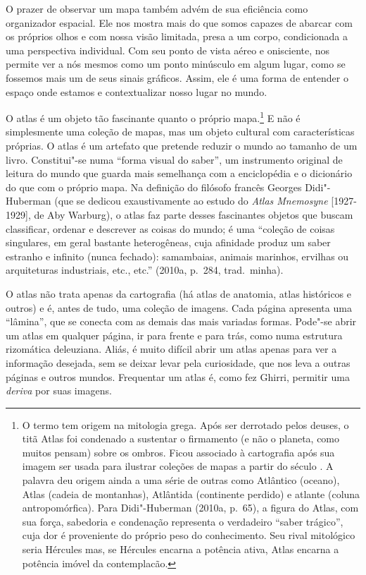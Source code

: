 O prazer de observar um mapa também advém de sua eficiência como
organizador espacial. Ele nos mostra mais do que somos capazes de
abarcar com os próprios olhos e com nossa visão limitada, presa a um
corpo, condicionada a uma perspectiva individual. Com seu ponto de vista
aéreo e onisciente, nos permite ver a nós mesmos como um ponto minúsculo
em algum lugar, como se fossemos mais um de seus sinais gráficos. Assim,
ele é uma forma de entender o espaço onde estamos e contextualizar nosso
lugar no mundo.

O atlas é um objeto tão fascinante quanto o próprio mapa.\footnote{O
  termo tem origem na mitologia grega. Após ser derrotado pelos deuses,
  o titã Atlas foi condenado a sustentar o firmamento (e não o planeta,
  como muitos pensam) sobre os ombros. Ficou associado à cartografia
  após sua imagem ser usada para ilustrar coleções de mapas a partir do
  século . A palavra deu origem ainda a uma série de outras como
  Atlântico (oceano), Atlas (cadeia de montanhas), Atlântida (continente
  perdido) e atlante (coluna antropomórfica). Para Didi"-Huberman (2010a,
  p.~65), a figura do Atlas, com sua força, sabedoria e condenação
  representa o verdadeiro ``saber trágico'', cuja dor é proveniente do
  próprio peso do conhecimento. Seu rival mitológico seria Hércules mas,
  se Hércules encarna a potência ativa, Atlas encarna a potência imóvel
  da contemplacão.} E não é simplesmente uma coleção de mapas, mas um
objeto cultural com características próprias. O atlas é um artefato que
pretende reduzir o mundo ao tamanho de um livro. Constitui"-se numa
``forma visual do saber'', um instrumento original de leitura do mundo
que guarda mais semelhança com a enciclopédia e o dicionário do que com
o próprio mapa. Na definição do filósofo francês Georges Didi"-Huberman
(que se dedicou exaustivamente ao estudo do \emph{Atlas Mnemosyne}
{[}1927-1929{]}, de Aby Warburg), o atlas faz parte desses fascinantes
objetos que buscam classificar, ordenar e descrever as coisas do mundo;
é uma ``coleção de coisas singulares, em geral bastante heterogêneas,
cuja afinidade produz um saber estranho e infinito (nunca fechado):
samambaias, animais marinhos, ervilhas ou arquiteturas industriais,
etc., etc.'' (2010a, p.~284, trad.~minha).

O atlas não trata apenas da cartografia (há atlas de anatomia, atlas
históricos e outros) e é, antes de tudo, uma coleção de imagens. Cada
página apresenta uma ``lâmina'', que se conecta com as demais das mais
variadas formas. Pode"-se abrir um atlas em qualquer página, ir para
frente e para trás, como numa estrutura rizomática deleuziana. Aliás, é
muito difícil abrir um atlas apenas para ver a informação desejada, sem
se deixar levar pela curiosidade, que nos leva a outras páginas e outros
mundos. Frequentar um atlas é, como fez Ghirri, permitir uma
\emph{deriva} por suas imagens.

